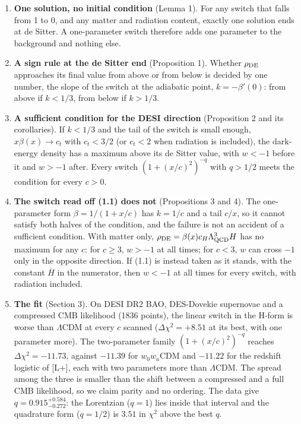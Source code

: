 \documentclass[11pt,a4paper]{article}
\begin{document}
\begin{enumerate}
\item{} {\bfseries\boldmath One solution, no initial condition} (Lemma 1). For any switch that falls from 1 to 0, and any matter and
radiation content, exactly one solution ends at de Sitter. A one-parameter switch therefore adds one parameter
to the background and nothing else.
\item{} {\bfseries\boldmath A sign rule at the de Sitter end} (Proposition 1). Whether $\rho_{\rm DE}$ approaches its final value from above
or from below is decided by one number, the slope of the switch at the adiabatic point, $k = -\beta'(0)$: from
above if $k < 1/3$, from below if $k > 1/3$.
\item{} {\bfseries\boldmath A sufficient condition for the DESI direction} (Proposition 2 and its corollaries). If $k < 1/3$ and the tail
of the switch is small enough, $x\beta(x) \to c_t$ with $c_t < 3/2$ (or $c_t < 2$ when radiation is included), the
dark-energy density has a maximum above its de Sitter value, with $w < -1$ before it and $w > -1$ after. Every
switch $(1 + (x/c)^2)^{-q}$ with $q > 1/2$ meets the condition for every $c > 0$.
\item{} {\bfseries\boldmath The switch read off (1.1) does not} (Propositions 3 and 4). The one-parameter form $\beta = 1/(1 + x/c)$ has
$k = 1/c$ and a tail $c/x$, so it cannot satisfy both halves of the condition, and the failure is not an accident
of a sufficient condition. With matter only, $\rho_{\rm DE} = \beta(x) c_H \Lambda_{\rm QCD}^3 H$ has no maximum for any
$c$: for $c \ge 3$, $w > -1$ at all times; for $c < 3$, $w$ can cross $-1$ only in the opposite direction. If (1.1)
is instead taken as it stands, with the constant $\overline{H}$ in the numerator, then $w < -1$ at all times for
every switch, with radiation included.
\item{} {\bfseries\boldmath The fit} (Section 3). On DESI DR2 BAO, DES-Dovekie supernovae and a compressed CMB likelihood (1836 points),
the linear switch in the H-form is worse than $\Lambda$CDM at every $c$ scanned ($\Delta\chi^2 = +8.51$ at its best,
with one parameter more). The two-parameter family $(1 + (x/c)^2)^{-q}$ reaches $\Delta\chi^2 = -11.73$, against
$-11.39$ for $w_0w_a$CDM and $-11.22$ for the redshift logistic of [L+], each with two parameters more than
$\Lambda$CDM. The spread among the three is smaller than the shift between a compressed and a full CMB likelihood,
so we claim parity and no ordering. The data give $q = 0.915^{+0.584}_{-0.272}$: the Lorentzian ($q = 1$) lies
inside that interval and the quadrature form ($q = 1/2$) is $3.51$ in $\chi^2$ above the best $q$.
\end{enumerate}
\end{document}
